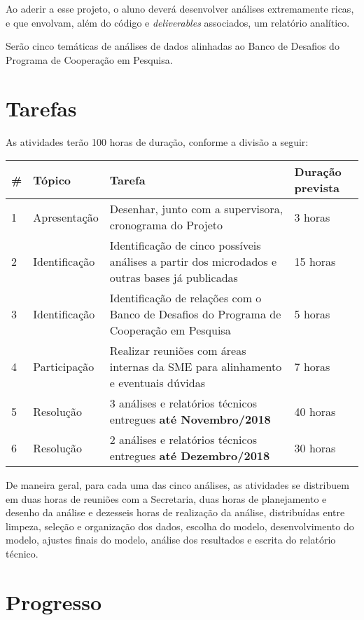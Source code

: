 \documentclass{article}
\begin{document}
Ao aderir a esse projeto, o aluno deverá desenvolver análises extremamente ricas, e que envolvam, além do código e \textit{deliverables} associados, um relatório analítico. 

Serão cinco temáticas de análises de dados alinhadas ao Banco de Desafios do Programa de Cooperação em Pesquisa.


\section{Tarefas}

As atividades terão 100 horas de duração, conforme a divisão a seguir:

\begin{center}
  \begin{tabular}{ | l | l | p{5cm} | l | }
    \hline
    \# & Tópico & Tarefa & Duração prevista \\ \hline
    1 & Apresentação & Desenhar, junto com a supervisora, cronograma do Projeto  & 3 horas \\ \hline
    2 & Identificação & Identificação de cinco possíveis análises a partir dos microdados e outras bases já publicadas & 15 horas \\ \hline
    3 & Identificação & Identificação de relações com o Banco de Desafios do Programa de Cooperação em Pesquisa & 5 horas \\ \hline
    4 & Participação & Realizar reuniões com áreas internas da SME para alinhamento e eventuais dúvidas & 7 horas \\ \hline
    5 & Resolução & 3 análises e relatórios técnicos entregues \textbf{até Novembro/2018} & 40 horas  \\ \hline
    6 & Resolução & 2 análises e relatórios técnicos entregues \textbf{até Dezembro/2018} & 30 horas \\ \hline
 \end{tabular}
\end{center}

De maneira geral, para cada uma das cinco análises, as atividades se distribuem em duas horas de reuniões com a Secretaria, duas horas de planejamento e desenho da análise e dezesseis horas de realização da análise, distribuídas entre limpeza, seleção e organização dos dados, escolha do modelo, desenvolvimento do modelo, ajustes finais do modelo, análise dos resultados e escrita do relatório técnico. 

\section{Progresso}
\end{document}
